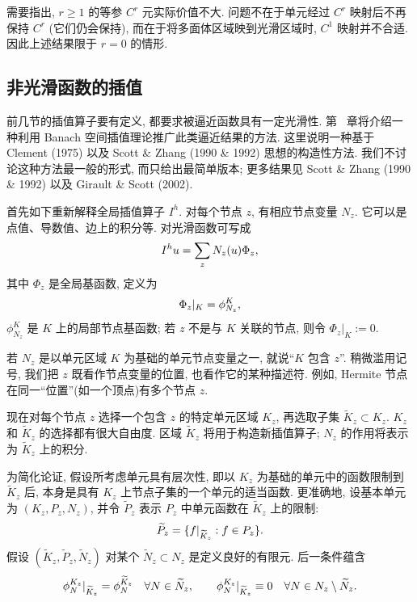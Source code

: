 需要指出, $r\geq1$ 的等参 $C^r$ 元实际价值不大. 问题不在于单元经过 $C^r$ 映射后不再保持 $C^r$ (它们仍会保持), 而在于将多面体区域映到光滑区域时, $C^1$ 映射并不合适. 因此上述结果限于 $r=0$ 的情形.

\subsection{非光滑函数的插值}
\label{sec:ch04-nonsmooth-function-interpolation}
\setcounter{thmcount}{0}
\setcounter{equation}{0}

前几节的插值算子要有定义, 都要求被逼近函数具有一定光滑性. 第~ 章将介绍一种利用 Banach 空间插值理论推广此类逼近结果的方法. 这里说明一种基于 Clement (1975) 以及 Scott \& Zhang (1990 \& 1992) 思想的构造性方法. 我们不讨论这种方法最一般的形式, 而只给出最简单版本; 更多结果见 Scott \& Zhang (1990 \& 1992) 以及 Girault \& Scott (2002).

首先如下重新解释全局插值算子 $I^h$. 对每个节点 $z$, 有相应节点变量 $N_z$. 它可以是点值、导数值、边上的积分等. 对光滑函数可写成
\begin{equation}
\MathBookFormulaID{formula-ch04-global-interpolant-nodal-sum}
\label{eq:ch04-global-interpolant-nodal-sum}
I^h u=\sum_zN_z(u)\Phi_z,
\end{equation}
其中 $\Phi_z$ 是全局基函数, 定义为
\[
\MathBookFormulaID{formula-ch04-global-basis-local-restriction}
\Phi_z|_K=\phi_{N_z}^K,
\]
$\phi_{N_z}^K$ 是 $K$ 上的局部节点基函数; 若 $z$ 不是与 $K$ 关联的节点, 则令 $\Phi_z|_K:=0$.

若 $N_z$ 是以单元区域 $K$ 为基础的单元节点变量之一, 就说``$K$ 包含 $z$''. 稍微滥用记号, 我们把 $z$ 既看作节点变量的位置, 也看作它的某种描述符. 例如, Hermite 节点在同一``位置''(如一个顶点)有多个节点 $z$.

现在对每个节点 $z$ 选择一个包含 $z$ 的特定单元区域 $K_z$, 再选取子集 $\widetilde K_z\subset K_z$. $K_z$ 和 $\widetilde K_z$ 的选择都有很大自由度. 区域 $\widetilde K_z$ 将用于构造新插值算子; $N_z$ 的作用将表示为 $\widetilde K_z$ 上的积分.

为简化论证, 假设所考虑单元具有层次性, 即以 $K_z$ 为基础的单元中的函数限制到 $\widetilde K_z$ 后, 本身是具有 $K_z$ 上节点子集的一个单元的适当函数. 更准确地, 设基本单元为 $(K_z,P_z,N_z)$, 并令 $\widetilde P_z$ 表示 $P_z$ 中单元函数在 $\widetilde K_z$ 上的限制:
\[
\MathBookFormulaID{formula-ch04-hierarchical-restricted-space}
\widetilde P_z=\{f|_{\widetilde K_z}:f\in P_z\}.
\]
假设 $(\widetilde K_z,\widetilde P_z,\widetilde N_z)$ 对某个 $\widetilde N_z\subset N_z$ 是定义良好的有限元. 后一条件蕴含
\begin{equation}
\MathBookFormulaID{formula-ch04-hierarchical-basis-restrictions}
\label{eq:ch04-hierarchical-basis-restrictions}
\phi_N^{K_z}|_{\widetilde K_z}=\phi_N^{\widetilde K_z}
\quad\forall N\in\widetilde N_z,
\qquad
\phi_N^{K_z}|_{\widetilde K_z}\equiv0
\quad\forall N\in N_z\setminus\widetilde N_z.
\end{equation}

